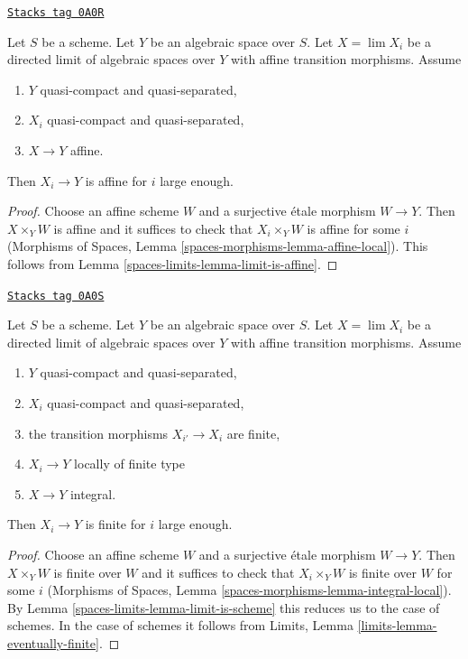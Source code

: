 \begin{lemma}
\label{spaces-limits-lemma-eventually-affine}
\href{https://stacks.math.columbia.edu/tag/0A0R}{\texttt{Stacks tag 0A0R}}

Let $S$ be a scheme. Let $Y$ be an algebraic space over $S$.
Let $X = \lim X_i$ be a directed limit of algebraic spaces over $Y$
with affine transition morphisms. Assume
\begin{enumerate}
\item $Y$ quasi-compact and quasi-separated,
\item $X_i$ quasi-compact and quasi-separated,
\item $X \to Y$ affine.
\end{enumerate}
Then $X_i \to Y$ is affine for $i$ large enough.
\end{lemma}

\begin{proof}
Choose an affine scheme $W$ and a surjective \'etale morphism $W \to Y$.
Then $X \times_Y W$ is affine and it suffices to check that
$X_i \times_Y W$ is affine for some $i$ (Morphisms of Spaces,
Lemma \ref{spaces-morphisms-lemma-affine-local}).
This follows from Lemma \ref{spaces-limits-lemma-limit-is-affine}.
\end{proof}

\begin{lemma}
\label{spaces-limits-lemma-eventually-finite}
\href{https://stacks.math.columbia.edu/tag/0A0S}{\texttt{Stacks tag 0A0S}}

Let $S$ be a scheme. Let $Y$ be an algebraic space over $S$.
Let $X = \lim X_i$ be a directed limit of algebraic spaces
over $Y$ with affine transition morphisms. Assume
\begin{enumerate}
\item $Y$ quasi-compact and quasi-separated,
\item $X_i$ quasi-compact and quasi-separated,
\item the transition morphisms $X_{i'} \to X_i$ are finite,
\item $X_i \to Y$ locally of finite type
\item $X \to Y$ integral.
\end{enumerate}
Then $X_i \to Y$ is finite for $i$ large enough.
\end{lemma}

\begin{proof}
Choose an affine scheme $W$ and a surjective \'etale morphism $W \to Y$.
Then $X \times_Y W$ is finite over $W$ and it suffices to check that
$X_i \times_Y W$ is finite over $W$ for some $i$ (Morphisms of Spaces,
Lemma \ref{spaces-morphisms-lemma-integral-local}). By
Lemma \ref{spaces-limits-lemma-limit-is-scheme} this reduces us to the case of schemes.
In the case of schemes it follows from
Limits, Lemma \ref{limits-lemma-eventually-finite}.
\end{proof}

